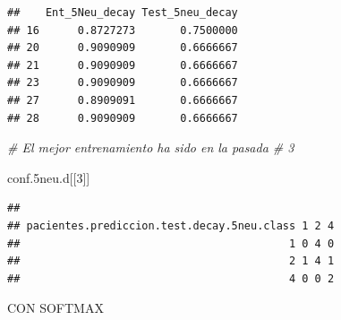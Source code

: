 \documentclass[]{article}
\newenvironment{Shaded}{\begin{snugshade}}{\end{snugshade}}
\newcommand{\CommentTok}[1]{\textcolor[rgb]{0.56,0.35,0.01}{\textit{#1}}}
\newcommand{\DecValTok}[1]{\textcolor[rgb]{0.00,0.00,0.81}{#1}}
\newcommand{\FloatTok}[1]{\textcolor[rgb]{0.00,0.00,0.81}{#1}}
\newcommand{\NormalTok}[1]{#1}
\begin{document}
\begin{verbatim}
##    Ent_5Neu_decay Test_5neu_decay
## 16      0.8727273       0.7500000
## 20      0.9090909       0.6666667
## 21      0.9090909       0.6666667
## 23      0.9090909       0.6666667
## 27      0.8909091       0.6666667
## 28      0.9090909       0.6666667
\end{verbatim}

\begin{Shaded}
\begin{Highlighting}[]
\CommentTok{# El mejor entrenamiento ha sido en la pasada # 3}

\NormalTok{conf}\FloatTok{.5}\NormalTok{neu.d[[}\DecValTok{3}\NormalTok{]]}
\end{Highlighting}
\end{Shaded}

\begin{verbatim}
##                                           
## pacientes.prediccion.test.decay.5neu.class 1 2 4
##                                          1 0 4 0
##                                          2 1 4 1
##                                          4 0 0 2
\end{verbatim}

CON SOFTMAX
\end{document}
